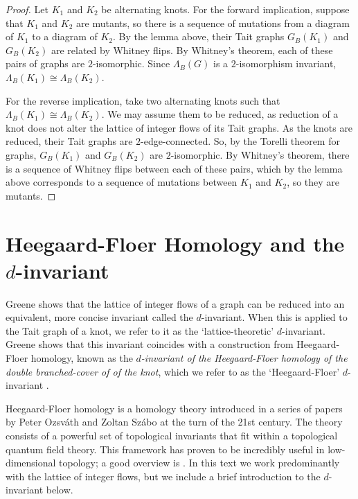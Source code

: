 \documentclass[12pt]{report}
\theoremstyle{upright}
\begin{document}
\begin{proof}
Let $K_{1}$ and $K_{2}$ be alternating knots. For the forward implication, suppose that $K_{1}$ and $K_{2}$ are mutants, so there is a sequence of mutations from a diagram of $K_{1}$ to a diagram of $K_{2}$. By the lemma above, their Tait graphs $G_{B}(K_{1})$ and $G_{B}(K_{2})$  are related by Whitney flips. By Whitney's theorem, each of these pairs of graphs are $2$-isomorphic. Since $\Lambda_{B}(G)$ is a $2$-isomorphism invariant, $\Lambda_{B}(K_{1}) \cong \Lambda_{B}(K_{2})$.

For the reverse implication, take two alternating knots such that $\Lambda_{B}(K_{1}) \cong \Lambda_{B}(K_{2})$. We may assume them to be reduced, as reduction of a knot does not alter the lattice of integer flows of its Tait graphs. As the knots are reduced, their Tait graphs are $2$-edge-connected. So, by the Torelli theorem for graphs, $G_{B}(K_{1})$ and $G_{B}(K_{2})$ are $2$-isomorphic. By Whitney's theorem, there is a sequence of Whitney flips between each of these pairs, which by the lemma above corresponds to a sequence of mutations between $K_{1}$ and $K_{2}$, so they are mutants.
\end{proof}

\section{Heegaard-Floer Homology and the $d$-invariant}

Greene shows that the lattice of integer flows of a graph can be reduced into an equivalent, more concise invariant called the $d$-invariant. When this is applied to the Tait graph of a knot, we refer to it as the `lattice-theoretic' $d$-invariant. Greene shows that this invariant  coincides with a construction from Heegaard-Floer homology, known as the \textit{$d$-invariant of the Heegaard-Floer homology of the double branched-cover of of the knot}, which we refer to as the `Heegaard-Floer' $d$-invariant \cite{lattices-graphs-mutation}.

Heegaard-Floer homology is a homology theory introduced in a series of papers by Peter Ozsv\'ath and Zoltan Sz\'abo \cite{on-heegaard-floer-of-covers, hf-homology-alternating, holomorphic-disks-invariants} at the turn of the 21st century. The theory consists of a powerful set of topological invariants that fit within a topological quantum field theory. This framework has proven to be incredibly useful in low-dimensional topology; a good overview is \cite{heegaard-floer-homology}. In this text we work predominantly with the lattice of integer flows, but we include a brief introduction to the $d$-invariant below.
\end{document}
